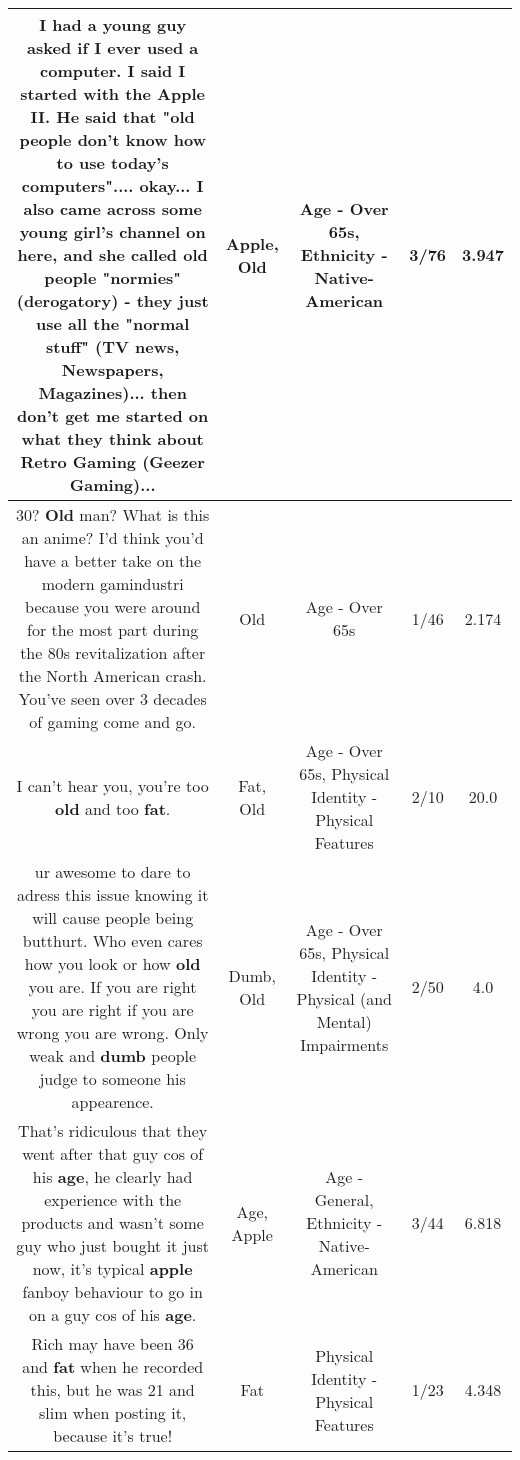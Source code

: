 \documentclass[11pt]{article}
\newlength\mylength
\begin{document}
\begin{center}
\begin{longtable}{|C{.65\mylength}|C{.30\mylength}|C{.12\mylength}|C{.12\mylength}|C{.12\mylength}|}
  \small I had a young guy asked if I ever used a computer. I said I started with the \textbf{Apple} II. He said that "\textbf{old} people don't know how to use today's computers".... okay... I also came across some young girl's channel on here, and she called \textbf{old} people "normies" (derogatory) - they just use all the "normal stuff" (TV news, Newspapers, Magazines)... then don't get me started on what they think about Retro Gaming (Geezer Gaming)...\normalsize   & Apple, Old & Age - Over 65s, Ethnicity - Native-American & 3/76 & 3.947 \\  \hline
  \small 30? \textbf{Old} man? What is this an anime? I'd think you'd have a better take on the modern gamindustri because you were around for the most part during the 80s revitalization after the North American crash. You've seen over 3 decades of gaming come and go.\normalsize   & Old & Age - Over 65s & 1/46 & 2.174 \\  \hline
  \small I can't hear you, you're too \textbf{old} and too \textbf{fat}.\normalsize   & Fat, Old & Age - Over 65s, Physical Identity - Physical Features & 2/10 & 20.0 \\  \hline
  \small ur awesome to dare to adress this issue knowing it will cause people being butthurt. Who even cares how you look or how \textbf{old} you are. If you are right you are right if you are wrong you are wrong. Only weak and \textbf{dumb} people judge to someone his appearence.\normalsize   & Dumb, Old & Age - Over 65s, Physical Identity - Physical (and Mental) Impairments & 2/50 & 4.0 \\  \hline
  \small That's ridiculous that they went after that guy cos of his \textbf{age}, he clearly had experience with the products and wasn't some guy who just bought it just now, it's typical \textbf{apple} fanboy behaviour to go in on a guy cos of his \textbf{age}.\normalsize   & Age, Apple & Age - General, Ethnicity - Native-American & 3/44 & 6.818 \\  \hline
  \small Rich may have been 36 and \textbf{fat} when he recorded this, but he was 21 and slim when posting it, because it's true!\normalsize   & Fat & Physical Identity - Physical Features & 1/23 & 4.348 \\  \hline

\end{longtable}
\end{center}
\end{document}
